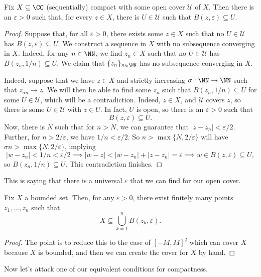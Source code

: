 \begin{lemma} \label{lem:singleepsilon}
	Fix $X\subseteq\CC$ (sequentially) compact with some open cover $\mathcal U$ of $X$. Then there is an $\varepsilon>0$ such that, for every $z\in X$, there is $U\in\mathcal U$ such that $B(z,\varepsilon)\subseteq U$.
\end{lemma}
\begin{proof}
	Suppose that, for all $\varepsilon>0$, there exists some $z\in X$ such that no $U\in\mathcal U$ has $B(z,\varepsilon)\subseteq U$. We construct a sequence in $X$ with no subsequence converging in $X$. Indeed, for any $n\in\NN$, we find $z_n\in X$ such that no $U\in\mathcal U$ has $B(z_n,1/n)\subseteq U$. We claim that $\{z_n\}_{n\in\NN}$ has no subsequence converging in $X$.

	Indeed, suppose that we have $z\in X$ and strictly increasing $\sigma:\NN\to\NN$ such that $z_{\sigma n}\to z$. We will then be able to find some $z_n$ such that $B(z_n,1/n)\subseteq U$ for some $U\in\mathcal U$, which will be a contradiction. Indeed, $z\in X$, and $\mathcal U$ covers $z$, so there is some $U\in\mathcal U$ with $z\in U$. In fact, $U$ is open, so there is an $\varepsilon>0$ such that
	\[B(z,\varepsilon)\subseteq U.\]
	Now, there is $N$ such that for $n>N$, we can guarantee that $|z-z_n|<\varepsilon/2$. Further, for $n>2/\varepsilon$, we have $1/n<\varepsilon/2$. So $n>\max\{N,2/\varepsilon\}$ will have $\sigma n>\max\{N,2/\varepsilon\}$, implying
	\[|w-z_n|<1/n<\varepsilon/2\implies|w-z|<|w-z_n|+|z-z_n|=\varepsilon\implies w\in B(z,\varepsilon)\subseteq U,\]
	so $B(z_n,1/n)\subseteq U$. This contradiction finishes.
\end{proof}
This is saying that there is a universal $\varepsilon$ that we can find for our open cover.
\begin{lemma} \label{lem:easycover}
	Fix $X$ a bounded set. Then, for any $\varepsilon>0$, there exist finitely many points $z_1,\ldots,z_n$ such that
	\[X\subseteq\bigcup_{k=1}^nB(z_k,\varepsilon).\]
\end{lemma}
\begin{proof}
	The point is to reduce this to the case of $[-M,M]^2$ which can cover $X$ because $X$ is bounded, and then we can create the cover for $X$ by hand.
\end{proof}
Now let's attack one of our equivalent conditions for compactness.
\closedbounded*
